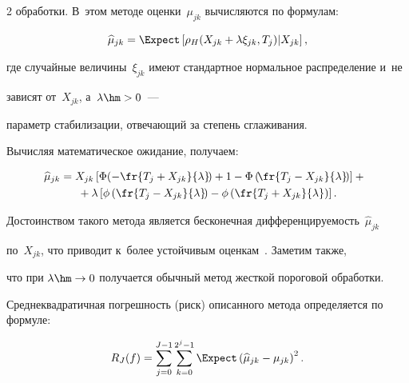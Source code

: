 \begin{multicols}{2}
обработки. В~этом методе оценки~$\mu_{jk}$ вы\-чис\-ля\-ют\-ся по формулам:

\begin{equation*}

\widehat{\mu}_{jk}=

\Expect \left[\rho_{H}(X_{jk}+\lambda\xi_{jk},T_j)|X_{jk}\right],

\end{equation*}

где случайные величины~$\xi_{jk}$ имеют стандартное нормальное распределение и~не 

зависят от~$X_{jk}$, а~$\lambda\hm>0$~--- 

параметр стабилизации, отвечающий за степень сглаживания. 

Вы\-чис\-ляя математическое ожидание, получаем:

\begin{multline*}

\hspace*{-1.5mm}\widehat{\mu}_{jk}=X_{jk}\left[\Phi\!\left(-\fr{T_j+X_{jk}}

{\lambda}\!\right)+1-

\Phi\left(\!\fr{T_j-X_{jk}}{\lambda}\!\right)\right]+{}\hspace*{0.43806pt}\hspace*{-0.87613pt}\\

{}+\lambda\left[

\phi\left(\fr{T_j-X_{jk}}{\lambda}\!\right)-

\phi\left(\fr{T_j+X_{jk}}{\lambda}\right)\right].

\end{multline*}

Достоинством такого метода является бесконечная диф\-фе\-рен\-ци\-ру\-емость~$\widehat{\mu}_{jk}$ 

по~$X_{jk}$, что приводит к~более устойчивым оценкам~\cite{HL10}. Заметим также, 

что при $\lambda\hm\to0$ получается обычный метод жест\-кой пороговой обработки.



Среднеквадратичная по\-греш\-ность (риск) описанного метода определяется по формуле:

\begin{equation*}

\label{Risk}

R_J(f)=\sum\limits_{j=0}^{J-1}\sum\limits_{k=0}^{2^j-1}\Expect

\left(\widehat{\mu}_{jk}-\mu_{jk}\right)^2.


\end{equation*}
\end{multicols}
